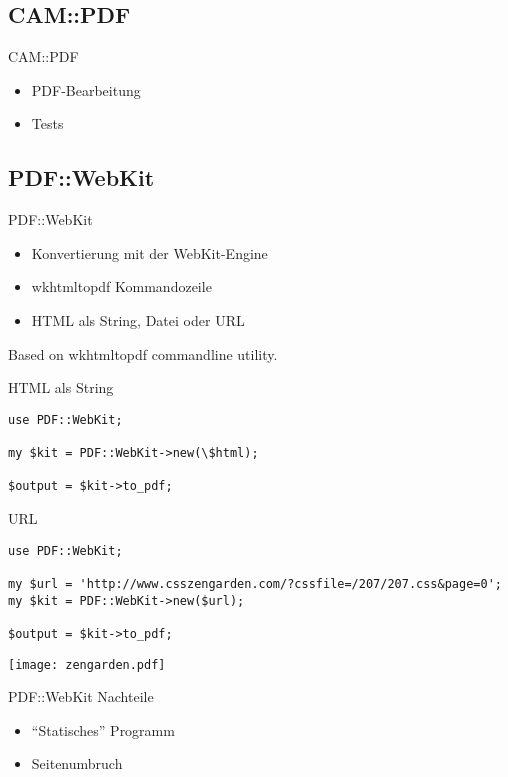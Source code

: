 \subsection{CAM::PDF}
\begin{frame}{CAM::PDF}
  \begin{itemize}
  \item PDF-Bearbeitung
  \item Tests
  \end{itemize}
\end{frame}

\subsection{PDF::WebKit}
\begin{frame}{PDF::WebKit}
  \begin{itemize}
  \item Konvertierung mit der WebKit-Engine
  \item wkhtmltopdf Kommandozeile
  \item HTML als String, Datei oder URL
  \end{itemize}
\end{frame}

Based on wkhtmltopdf commandline utility.

\begin{frame}[fragile]{HTML als String}
\begin{lstlisting}
use PDF::WebKit;

my $kit = PDF::WebKit->new(\$html);

$output = $kit->to_pdf;
\end{lstlisting}
\end{frame}

\begin{frame}[fragile]{URL}
\begin{lstlisting}
use PDF::WebKit;

my $url = 'http://www.csszengarden.com/?cssfile=/207/207.css&page=0';
my $kit = PDF::WebKit->new($url);

$output = $kit->to_pdf;
\end{lstlisting}
\end{frame}

\begin{frame}
\texttt{[image: zengarden.pdf]}
\end{frame}

\begin{frame}{PDF::WebKit Nachteile}
  \begin{itemize}
  \item ``Statisches'' Programm
  \item Seitenumbruch
  \end{itemize}
\end{frame}

